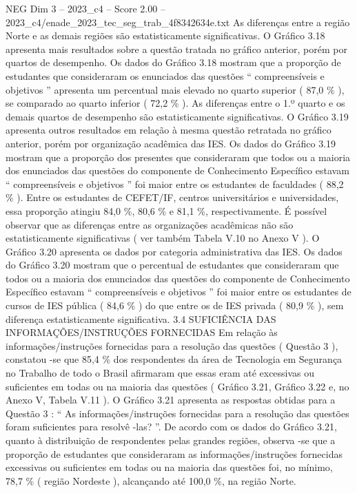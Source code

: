\begin{textsample}{NEG Dim 3 – 2023\_c4 – Score 2.00 – 2023\_c4/enade\_2023\_tec\_seg\_trab\_4f8342634e.txt}
As diferenças entre a região Norte e as demais regiões são estatisticamente significativas.
O Gráfico 3.18 apresenta mais resultados sobre a questão tratada no gráfico anterior, porém por quartos de desempenho.
Os dados do Gráfico 3.18 mostram que a proporção de estudantes que consideraram os enunciados das questões “ compreensíveis e objetivos ” apresenta um percentual mais elevado no quarto superior ( 87,0 \% ), se comparado ao quarto inferior ( 72,2 \% ).
As diferenças entre o 1.º quarto e os demais quartos de desempenho são estatisticamente significativas.
O Gráfico 3.19 apresenta outros resultados em relação à mesma questão retratada no gráfico anterior, porém por organização acadêmica das IES.
Os dados do Gráfico 3.19 mostram que a proporção dos presentes que consideraram que todos ou a maioria dos enunciados das questões do componente de Conhecimento Específico estavam “ compreensíveis e objetivos ” foi maior entre os estudantes de faculdades ( 88,2 \% ).
Entre os estudantes de CEFET/IF, centros universitários e universidades, essa proporção atingiu 84,0 \%, 80,6 \% e 81,1 \%, respectivamente.
É possível observar que as diferenças entre as organizações acadêmicas não são estatisticamente significativas ( ver também Tabela V.10 no Anexo V ).
O Gráfico 3.20 apresenta os dados por categoria administrativa das IES.
Os dados do Gráfico 3.20 mostram que o percentual de estudantes que consideraram que todos ou a maioria dos enunciados das questões do componente de Conhecimento Específico estavam “ compreensíveis e objetivos ” foi maior entre os estudantes de cursos de IES pública ( 84,6 \% ) do que entre os de IES privada ( 80,9 \% ), sem diferença estatisticamente significativa. 3.4 SUFICIÊNCIA DAS INFORMAÇÕES/INSTRUÇÕES FORNECIDAS Em relação às informações/instruções fornecidas para a resolução das questões ( Questão 3 ), constatou -se que 85,4 \% dos respondentes da área de Tecnologia em Segurança no Trabalho de todo o Brasil afirmaram que essas eram até excessivas ou suficientes em todas ou na maioria das questões ( Gráfico 3.21, Gráfico 3.22 e, no Anexo V, Tabela V.11 ).
O Gráfico 3.21 apresenta as respostas obtidas para a Questão 3 : “ As informações/instruções fornecidas para a resolução das questões foram suficientes para resolvê -las? ”.
De acordo com os dados do Gráfico 3.21, quanto à distribuição de respondentes pelas grandes regiões, observa -se que a proporção de estudantes que consideraram as informações/instruções fornecidas excessivas ou suficientes em todas ou na maioria das questões foi, no mínimo, 78,7 \% ( região Nordeste ), alcançando até 100,0 \%, na região Norte.

\end{textsample}
